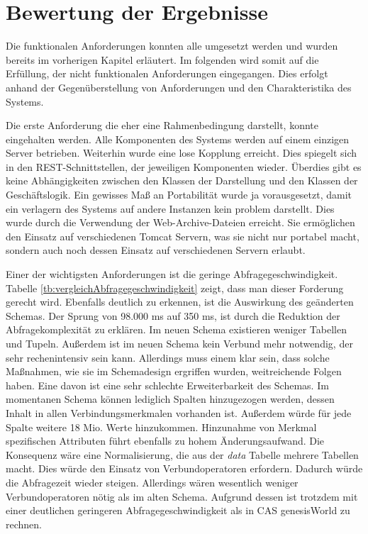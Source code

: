 \section{Bewertung der Ergebnisse}
\label{ch:Ergebnis:sec:bewertung}

Die funktionalen Anforderungen konnten alle umgesetzt werden und wurden bereits im vorherigen Kapitel erläutert. Im folgenden wird somit auf die Erfüllung, der nicht funktionalen Anforderungen eingegangen. Dies erfolgt anhand der Gegenüberstellung von Anforderungen und den Charakteristika des Systems.

Die erste Anforderung die eher eine Rahmenbedingung darstellt, konnte eingehalten werden. Alle Komponenten des Systems werden auf einem einzigen Server betrieben. Weiterhin wurde eine lose Kopplung erreicht. Dies spiegelt sich in den REST-Schnittstellen, der jeweiligen Komponenten wieder. Überdies gibt es keine Abhängigkeiten zwischen den Klassen der Darstellung und den Klassen der Geschäftslogik. Ein gewisses Maß an Portabilität wurde ja vorausgesetzt, damit ein verlagern des Systems auf andere Instanzen kein problem darstellt. Dies wurde durch die Verwendung der Web-Archive-Dateien erreicht. Sie ermöglichen den Einsatz auf verschiedenen Tomcat Servern, was sie nicht nur portabel macht, sondern auch noch dessen Einsatz auf verschiedenen Servern erlaubt. 

Einer der wichtigsten Anforderungen ist die geringe Abfragegeschwindigkeit. Tabelle \ref{tb:vergleichAbfragegeschwindigkeit} zeigt, dass man dieser Forderung gerecht wird. Ebenfalls deutlich zu erkennen, ist die Auswirkung des geänderten Schemas. Der Sprung von 98.000 ms auf 350 ms, ist durch die Reduktion der Abfragekomplexität zu erklären. Im neuen Schema existieren weniger Tabellen und Tupeln. Außerdem ist im neuen Schema kein Verbund mehr notwendig, der sehr rechenintensiv sein kann. Allerdings muss einem klar sein, dass solche Maßnahmen, wie sie im Schemadesign ergriffen wurden, weitreichende Folgen haben. Eine davon ist eine sehr schlechte Erweiterbarkeit des Schemas. Im momentanen Schema können lediglich Spalten hinzugezogen werden, dessen Inhalt in allen Verbindungsmerkmalen vorhanden ist. Außerdem würde für jede Spalte weitere 18 Mio. Werte hinzukommen. Hinzunahme von Merkmal spezifischen Attributen führt ebenfalls zu hohem Änderungsaufwand. Die Konsequenz wäre eine Normalisierung, die aus der \textit{data} Tabelle mehrere Tabellen macht. Dies würde den Einsatz von Verbundoperatoren erfordern. Dadurch würde die Abfragezeit wieder steigen. Allerdings wären wesentlich weniger Verbundoperatoren nötig als im alten Schema. Aufgrund dessen ist trotzdem mit einer deutlichen geringeren Abfragegeschwindigkeit als in CAS genesisWorld zu rechnen.  

